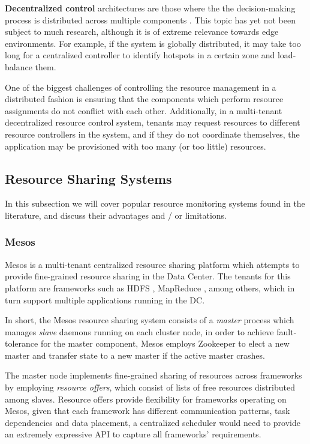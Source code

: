 \textbf{Decentralized control} architectures are those where the the decision-making process is distributed across multiple components \cite{Hong2019}. This topic has yet not been subject to much research, although it is of extreme relevance towards edge environments. For example, if the system is globally distributed, it may take too long for a centralized controller to identify hotspots in a certain zone and load-balance them.

One of the biggest challenges of controlling the resource management in a distributed fashion is ensuring that the components which perform resource assignments do not conflict with each other. Additionally, in a multi-tenant decentralized resource control system, tenants may request resources to different resource controllers in the system, and if they do not coordinate themselves, the application may be provisioned with too many (or too little) resources.

\subsection{Resource Sharing Systems}

In this subsection we will cover popular resource monitoring systems found in the literature, and discuss their advantages and / or limitations.

\subsubsection{Mesos}

Mesos \cite{hindman2011mesos} is a multi-tenant centralized resource sharing platform which attempts to provide fine-grained resource sharing in the Data Center. The tenants for this platform are frameworks such as HDFS \cite{borthakur2008hdfs}, MapReduce \cite{dean2008mapreduce}, among others, which in turn support multiple applications running in the DC.

In short, the Mesos resource sharing system consists of a \textit{master} process which manages \textit{slave} daemons running on each cluster node, in order to achieve fault-tolerance for the master component, Mesos employs Zookeeper \cite{hunt2010zookeeper} to elect a new master and transfer state to a new master if the active master crashes.

The master node implements fine-grained sharing of resources across frameworks by employing \textit{resource offers}, which consist of lists of free resources distributed among slaves. Resource offers provide flexibility for frameworks operating on Mesos, given that each framework has different communication patterns, task dependencies and data placement, a centralized scheduler would need to provide an extremely expressive API to capture all frameworks' requirements. 

